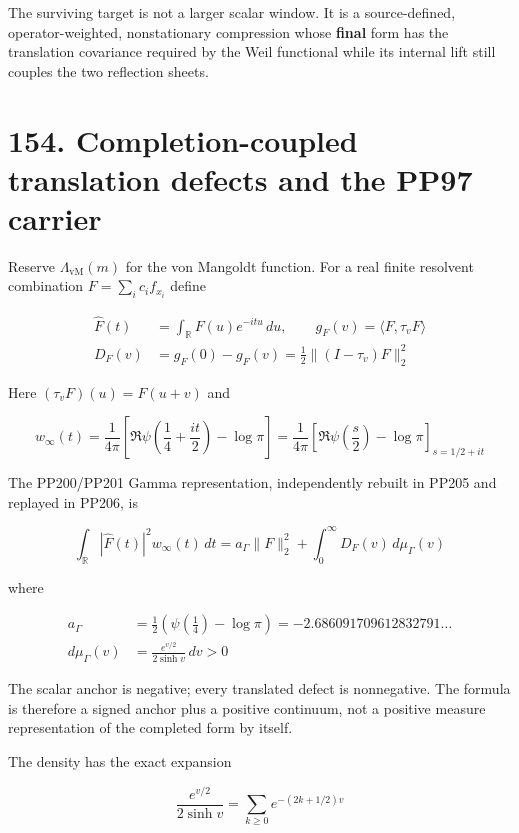 \documentclass[
  11pt,
]{book}
\begin{document}
The surviving target is not a larger scalar window. It is a
source-defined, operator-weighted, nonstationary compression whose
\textbf{final} form has the translation covariance required by the Weil
functional while its internal lift still couples the two reflection
sheets.

\section{154. Completion-coupled translation defects and the PP97
carrier}\label{completion-coupled-translation-defects-and-the-pp97-carrier}

Reserve \(\Lambda_{\mathrm{vM}}(m)\) for the von Mangoldt function. For
a real finite resolvent combination \(F=\sum_i c_if_{x_i}\) define

\[
\begin{aligned}
\widehat F(t)&=\int_{\mathbb R}F(u)e^{-itu}\,du,\qquad
g_F(v)=\langle F,\tau_vF\rangle\\
D_F(v)&=g_F(0)-g_F(v)=\frac12\|(I-\tau_v)F\|_2^2
\end{aligned}
\tag{154.1}
\]

Here \((\tau_vF)(u)=F(u+v)\) and

\[
w_\infty(t)=\frac1{4\pi}
\left[\Re\psi\!\left(\frac14+\frac{it}{2}\right)-\log\pi\right]
=\frac1{4\pi}\left[\Re\psi\!\left(\frac{s}2\right)-\log\pi\right]_{s=1/2+it}
\tag{154.2}
\]

The PP200/PP201 Gamma representation, independently rebuilt in PP205 and
replayed in PP206, is

\[
\boxed{
\int_{\mathbb R}|\widehat F(t)|^2w_\infty(t)\,dt
=a_\Gamma\|F\|_2^2
+\int_0^\infty D_F(v)\,d\mu_\Gamma(v)}
\tag{154.3}
\]

where

\[
\boxed{\begin{aligned}
a_\Gamma&=\frac12\!\left(\psi\!\left(\frac14\right)-\log\pi\right)
=-2.686091709612832791\ldots\\
d\mu_\Gamma(v)&=\frac{e^{v/2}}{2\sinh v}\,dv>0
\end{aligned}}
\tag{154.4}
\]

The scalar anchor is negative; every translated defect is nonnegative.
The formula is therefore a signed anchor plus a positive continuum, not
a positive measure representation of the completed form by itself.

The density has the exact expansion

\[
\frac{e^{v/2}}{2\sinh v}=\sum_{k\ge0}e^{-(2k+1/2)v}
\tag{154.5}
\]
\end{document}
